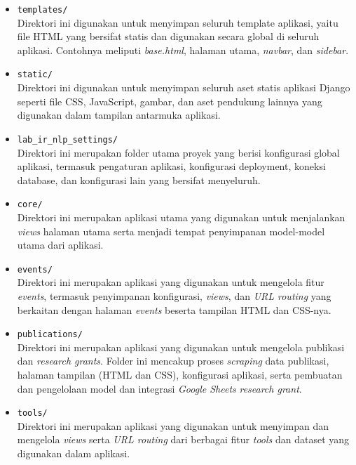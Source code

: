 \begin{itemize}
    \item \texttt{templates/} \\
    Direktori ini digunakan untuk menyimpan seluruh template aplikasi, yaitu file HTML yang bersifat statis dan digunakan secara global di seluruh aplikasi. Contohnya meliputi \textit{base.html}, halaman utama, \textit{navbar}, dan \textit{sidebar}.

    \item \texttt{static/} \\
    Direktori ini digunakan untuk menyimpan seluruh aset statis aplikasi Django seperti file CSS, JavaScript, gambar, dan aset pendukung lainnya yang digunakan dalam tampilan antarmuka aplikasi.

    \item \texttt{lab\_ir\_nlp\_settings/} \\
    Direktori ini merupakan folder utama proyek yang berisi konfigurasi global aplikasi, termasuk pengaturan aplikasi, konfigurasi deployment, koneksi database, dan konfigurasi lain yang bersifat menyeluruh.

    \item \texttt{core/} \\
    Direktori ini merupakan aplikasi utama yang digunakan untuk menjalankan \textit{views} halaman utama serta menjadi tempat penyimpanan model-model utama dari aplikasi.

    \item \texttt{events/} \\
    Direktori ini merupakan aplikasi yang digunakan untuk mengelola fitur \textit{events}, termasuk penyimpanan konfigurasi, \textit{views}, dan \textit{URL routing} yang berkaitan dengan halaman \textit{events} beserta tampilan HTML dan CSS-nya.

    \item \texttt{publications/} \\
    Direktori ini merupakan aplikasi yang digunakan untuk mengelola publikasi dan \textit{research grants}. Folder ini mencakup proses \textit{scraping} data publikasi, halaman tampilan (HTML dan CSS), konfigurasi aplikasi, serta pembuatan dan pengelolaan model dan integrasi \textit{Google Sheets} \textit{research grant}.
    
    \item \texttt{tools/} \\
    Direktori ini merupakan aplikasi yang digunakan untuk menyimpan dan mengelola \textit{views} serta \textit{URL routing} dari berbagai fitur \textit{tools} dan dataset yang digunakan dalam aplikasi.
    

\end{itemize}
